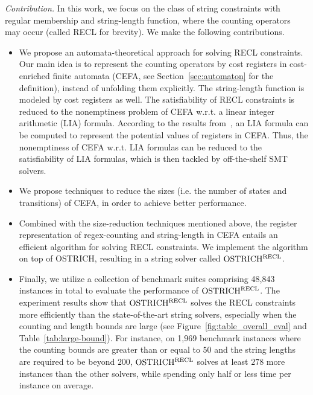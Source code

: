 \medskip
\noindent 
\emph{Contribution.} In this work, we focus on the class of string constraints with regular membership and string-length function, where the counting operators may occur (called RECL for brevity). We make the following contributions.
\begin{itemize}
  \item We propose an automata-theoretical approach for solving RECL constraints. 
  Our main idea is to represent the counting operators by cost registers in cost-enriched finite automata (CEFA, see Section~\ref{sec:automaton} for the definition), instead of unfolding them explicitly. The string-length function is modeled by cost registers as well. The satisfiability of RECL constraints is reduced to the nonemptiness problem of CEFA w.r.t. a linear integer arithmetic (LIA) formula. According to the results from~\cite{atva2020}, an LIA formula can be computed to represent the potential values of registers in CEFA.
Thus, the nonemptiness of CEFA w.r.t. LIA formulas can be reduced to the satisfiability of LIA formulas, which is then tackled by off-the-shelf SMT solvers.
  \item We propose techniques to reduce the sizes (i.e. the number of states and transitions) of CEFA, in order to achieve better performance.
  \item Combined with the size-reduction techniques mentioned above, the register representation of regex-counting and string-length in CEFA entails an efficient algorithm for solving RECL constraints. We implement the algorithm on top of OSTRICH, resulting in a string solver called $\rm OSTRICH^{RECL}$. 
  \item Finally, we utilize a collection of benchmark suites comprising 48,843 instances in total to evaluate the performance of $\rm OSTRICH^{RECL}$. The experiment results show that $\rm OSTRICH^{RECL}$ solves the RECL constraints more efficiently than the state-of-the-art string solvers, especially when the counting and length bounds are large (see Figure~\ref{fig:table_overall_eval} and Table~\ref{tab:large-bound}). For instance, on 1,969 benchmark instances where the counting bounds are greater than or equal to $50$ and the string lengths are required to be beyond $200$, $\rm OSTRICH^{RECL}$ solves at least $278$ more instances than the other solvers, while spending only half or less time per instance on average. 
\end{itemize}


